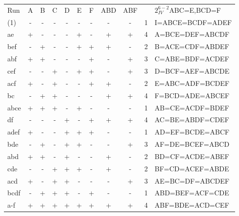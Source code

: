 \documentclass[
  10pt,
  twocolumn]{article}
\begin{document}
\begin{tabular}{ l|c|c|c|c|c|c|c|c|c|l| }
Run&A & B & C & D & E & F &{\tiny ABD}&{\tiny ABF}&&$2^{6-2}_{IV}$ABC=E,BCD=F\\
 (1) &- & - & - & - & - & - & -   & - & 1 &{\scriptsize I=ABCE=BCDF=ADEF}\\
 ae  &+ & - & - & - & + & - & +   & + & 4 &{\scriptsize A=BCE=DEF=ABCDF}\\
 bef &- & + & - & - & + & + & +   & - & 2 &{\scriptsize B=ACE=CDF=ABDEF}\\
 abf &+ & + & - & - & - & + & -   & + & 3 &{\scriptsize C=ABE=BDF=ACDEF}\\
 cef &- & - & + & - & + & + & -   & + & 3 &{\scriptsize D=BCF=AEF=ABCDE}\\
 acf &+ & - & + & - & - & + & +   & - & 2 &{\scriptsize E=ABC=ADF=BCDEF}\\
 bc  &- & + & + & - & - & - & +   & + & 4 &{\scriptsize F=BCD=ADE=ABCEF}\\
 abce&+ & + & + & - & + & - & -   & - & 1 &{\scriptsize AB=CE=ACDF=BDEF}\\
 df  &- & - & - & + & - & + & +   & + & 4 &{\scriptsize AC=BE=ABDF=CDEF}\\
 adef&+ & - & - & + & + & + & -   & - & 1 &{\scriptsize AD=EF=BCDE=ABCF}\\
 bde &- & + & - & + & + & - & -   & + & 3 &{\scriptsize AF=DE=BCEF=ABCD}\\
 abd &+ & + & - & + & - & - & +   & - & 2 &{\scriptsize BD=CF=ACDE=ABEF}\\
 cde &- & - & + & + & + & - & +   & - & 2 &{\scriptsize BF=CD=ACEF=ABDE}\\
 acd &+ & - & + & + & - & - & -   & + & 3 &{\scriptsize AE=BC=DF=ABCDEF}\\
 bcdf&- & + & + & + & - & + & -   & - & 1 &{\scriptsize ABD=BEF=ACF=CDE}\\
 a-f &+ & + & + & + & + & + & +   & + & 4 &{\scriptsize ABF=BDE=ACD=CEF}
\end{tabular}
\end{document}
